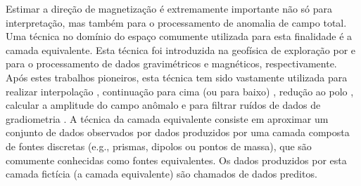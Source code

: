Estimar a direção de magnetização é extremamente importante não só para interpretação, mas também para o processamento de anomalia de campo total. Uma técnica no domínio do espaço comumente utilizada para esta finalidade é a camada equivalente. Esta técnica foi introduzida na geofísica de exploração por \cite{dampney1969} e \cite{emilia_massey_1974} para o processamento de dados gravimétricos e magnéticos, respectivamente. Após estes trabalhos pioneiros, esta técnica tem sido vastamente utilizada para realizar interpolação \citep{cordell_1992, mendonca-silva_1994, barnes-lumley_2011, siqueira_etal_2017}, continuação para cima (ou para baixo) \citep{hansen-miyazaki_1984, li-oldenburg_2010}, redução ao polo \citep{silva_1986, leao-silva_1989, guspi-novara_2009, oliveirajr-etal_2013}, calcular a amplitude do campo anômalo \citep{li_li_2014} e para filtrar ruídos de dados de gradiometria \citep{martinez_li_2016}. A técnica da camada equivalente consiste em aproximar um conjunto de dados observados por dados produzidos por uma camada composta de fontes discretas (e.g., prismas, dipolos ou pontos de massa), que são comumente conhecidas como fontes equivalentes. Os dados produzidos por esta camada fictícia (a camada equivalente) são chamados de dados preditos. 

